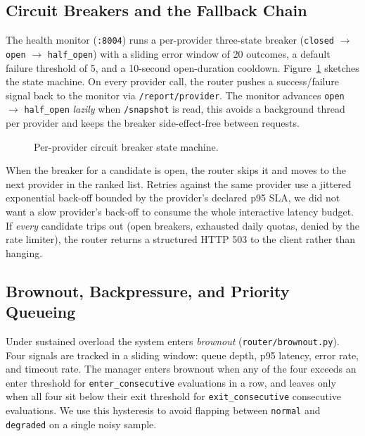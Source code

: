 \documentclass[conference,letterpaper]{IEEEtran}
\begin{document}
\subsection{Circuit Breakers and the Fallback Chain}
The health monitor (\texttt{:8004}) runs a per-provider three-state
breaker (\texttt{closed} $\to$ \texttt{open} $\to$ \texttt{half\_open})
with a sliding error window of 20 outcomes, a default failure
threshold of 5, and a 10-second open-duration cooldown.
Figure~\ref{fig:breaker} sketches the state machine. On every
provider call, the router pushes a success/failure signal back to
the monitor via \texttt{/report/{provider}}. The monitor advances
\texttt{open} $\to$ \texttt{half\_open} \emph{lazily} when
\texttt{/snapshot} is read, this avoids a background thread per
provider and keeps the breaker side-effect-free between requests.

\begin{figure}[!t]
\centering
{}
\caption{Per-provider circuit breaker state machine.}
\label{fig:breaker}
\end{figure}

When the breaker for a candidate is open, the router skips it and
moves to the next provider in the ranked list. Retries against the
same provider use a jittered exponential back-off bounded by the
provider's declared p95 SLA, we did not want a slow provider's
back-off to consume the whole interactive latency budget. If
\emph{every} candidate trips out (open breakers, exhausted daily
quotas, denied by the rate limiter), the router returns a structured
HTTP 503 to the client rather than hanging.

\subsection{Brownout, Backpressure, and Priority Queueing}
Under sustained overload the system enters \emph{brownout}
(\texttt{router/brownout.py}). Four signals are tracked in a sliding
window: queue depth, p95 latency, error rate, and timeout rate. The
manager enters brownout when any of the four exceeds an enter
threshold for \texttt{enter\_consecutive} evaluations in a row, and
leaves only when all four sit below their exit threshold for
\texttt{exit\_consecutive} consecutive evaluations. We use this
hysteresis to avoid flapping between \texttt{normal} and
\texttt{degraded} on a single noisy sample.
\end{document}
